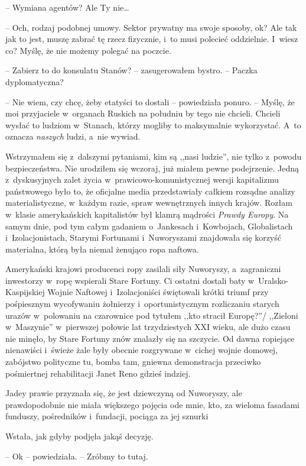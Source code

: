 \documentclass[oneside,polish,12pt,sfheadings]{mwbk}
\begin{document}
-- Wymiana agentów? Ale Ty nie\ldots

-- Och, rodzaj podobnej umowy. Sektor prywatny ma swoje sposoby, ok? Ale
tak jak to jest, muszę zabrać tę rzecz fizycznie, i~to musi polecieć
oddzielnie. I~wiesz co? Myślę, że nie możemy polegać na poczcie.

-- Zabierz to do konsulatu Stanów? -- zasugerowałem bystro. -- Paczka
dyplomatyczna?

-- Nie wiem, czy chcę, żeby etatyści to dostali -- powiedziała ponuro. --
Myślę, że moi przyjaciele w~organach Ruskich na południu by tego nie
chcieli. Chcieli wysłać to ludziom w~Stanach, którzy mogliby to
maksymalnie wykorzystać. A~to oznacza \emph{naszych} ludzi, a~nie
wywiad.

Wstrzymałem się z~dalszymi pytaniami, kim są ,,nasi ludzie'', nie tylko z~powodu bezpieczeństwa. Nie urodziłem się wczoraj, już miałem pewne
podejrzenie. Jedną z~dyskusyjnych zalet życia w~prawicowo-komunistycznej
wersji kapitalizmu państwowego było to, że oficjalne media przedstawiały
całkiem rozsądne analizy materialistyczne, w~każdym razie, spraw
wewnętrznych innych krajów. Rozłam w~klasie amerykańskich kapitalistów
był klamrą mądrości \emph{Prawdy Europy}. Na samym dnie, pod tym całym
gadaniem o~Jankesach i~Kowbojach, Globalistach i~Izolacjonistach,
Starymi Fortunami i~Nuworyszami znajdowała się korzyść materialna, którą
była niemal żenująco ropa naftowa.

Amerykański krajowi producenci ropy zasilali siły Nuworyszy, a~zagraniczni inwestorzy w~ropę wspierali Stare Fortuny. Ci ostatni
dostali baty w~Uralsko-Kaspijskiej Wojnie Naftowej i~Izolacjoniści
świętowali krótki triumf przy pośpiesznym wycofywaniu żołnierzy i~oportunistycznym rozliczaniu starych urazów w~polowaniu na czarownice
pod tytułem ,,kto stracił Europę?''/ ,,Zieloni w~Maszynie'' w~pierwszej
połowie lat trzydziestych XXI wieku, ale dużo czasu nie minęło, by Stare
Fortuny znów znalazły się na szczycie. Od dawna ropiejące nienawiści i~świeże żale były obecnie rozgrywane w~cichej wojnie domowej, zabójstwo
polityczne tu, bomba tam, gniewna demonstracja przeciwko pośmiertnej
rehabilitacji Janet Reno gdzieś indziej.

Jadey prawie przyznała się, że jest dziewczyną od Nuworyszy, ale
prawdopodobnie nie miała większego pojęcia ode mnie, kto, za wieloma
fasadami funduszy, pośredników i~fundacji, pociąga za jej sznurki

Wstała, jak gdyby podjęła jakąś decyzję.

-- Ok -- powiedziała. -- Zróbmy to tutaj.
\end{document}

